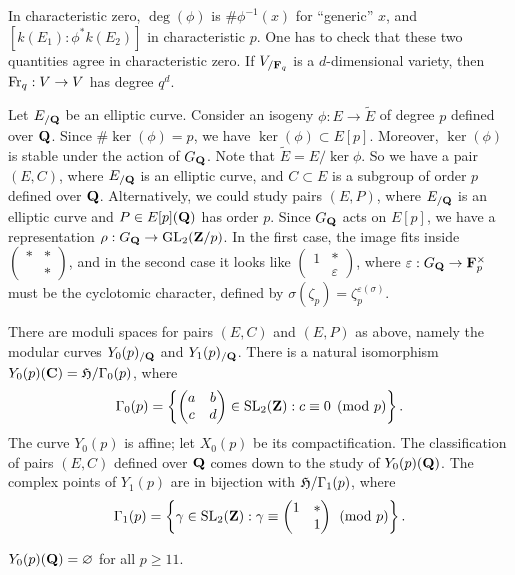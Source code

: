 In characteristic zero, $\deg(\phi)$ is $\# \phi^{-1}(x)$ for ``generic'' 
$x$, and $[k(E_1):\phi^\ast k(E_2)]$ in characteristic $p$. One has to check 
that these two quantities agree in characteristic zero. If $V_{/\mathbf{F}_q}$ is a 
$d$-dimensional variety, then $\operatorname{Fr}_q:V\to V$ has degree $q^d$. 

Let $E_{/\mathbf{Q}}$ be an elliptic curve. Consider an isogeny 
$\phi:E\to \widetilde E$ of degree $p$ defined over $\mathbf{Q}$. Since 
$\#\ker(\phi)=p$, we have $\ker(\phi)\subset E[p]$. Moreover, $\ker(\phi)$ is 
stable under the action of $G_{\mathbf{Q}}$. Note that $\widetilde E=E/\ker\phi$. So we 
have a pair $(E,C)$, where $E_{/\mathbf{Q}}$ is an elliptic curve, and $C\subset E$ is 
a subgroup of order $p$ defined over $\mathbf{Q}$. Alternatively, we could study pairs 
$(E,P)$, where $E_{/\mathbf{Q}}$ is an elliptic curve and $P\in E[p](\mathbf{Q})$ has order 
$p$. Since $G_{\mathbf{Q}}$ acts on $E[p]$, we have a representation 
$\rho:G_{\mathbf{Q}}\to \operatorname{GL}_2(\mathbf{Z}/p)$. In the first case, the image fits inside 
$\begin{pmatrix} \ast & \ast \\ & \ast \end{pmatrix}$, and in 
the second case it looks like 
$\begin{pmatrix} 1 & \ast \\ & \varepsilon\end{pmatrix}$, 
where $\varepsilon:G_{\mathbf{Q}}\to \mathbf{F}_p^\times$ must be the cyclotomic character, 
defined by $\sigma(\zeta_p) = \zeta_p^{\varepsilon(\sigma)}$. 

There are moduli spaces for pairs $(E,C)$ and $(E,P)$ as above, namely the 
modular curves $Y_0(p)_{/\mathbf{Q}}$ and $Y_1(p)_{/\mathbf{Q}}$. There is a natural 
isomorphism $Y_0(p)(\mathbf{C}) = \mathfrak{H}/\Gamma_0(p)$, where 
\[
  \Gamma_0(p) = \left\{\begin{pmatrix} a & b \\ c & d \end{pmatrix}\in \operatorname{SL}_2(\mathbf{Z}):c\equiv 0\pmod p\right\} .
\]
The curve $Y_0(p)$ is affine; let $X_0(p)$ be its compactification. The 
classification of pairs $(E,C)$ defined over $\mathbf{Q}$ comes down to the study of 
$Y_0(p)(\mathbf{Q})$. The complex points of $Y_1(p)$ are in bijection with 
$\mathfrak{H}/\Gamma_1(p)$, where 
\[
  \Gamma_1(p) = \left\{\gamma\in \operatorname{SL}_2(\mathbf{Z}):\gamma\equiv \begin{pmatrix} 1 & \ast \\ & 1 \end{pmatrix} \pmod p\right\} .
\]

\begin{theorem}[Mazur]
$Y_0(p)(\mathbf{Q})=\varnothing$ for all $p\geqslant 11$. 
\end{theorem}

